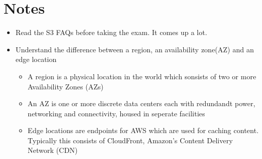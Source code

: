 \documentclass{article}
\begin{document}
\section{Notes}
\begin{itemize}
\item
Read the S3 FAQs before taking the exam. It comes up a lot.

\item
Understand the difference between a region, an availability zone(AZ) and an edge location
	\begin{itemize}
	\item
	A region is a physical location in the world which sonsists of two or more Availability Zones (AZs)

	\item
	An AZ is one or more discrete data centers each with redundandt power, networking and connectivity, housed in seperate facilities

	\item
	Edge locations are endpoints for AWS which are used for caching content. Typically this consists of CloudFront, Amazon's Content Delivery Network (CDN)
\end{itemize}
\end{itemize}
\end{document}
